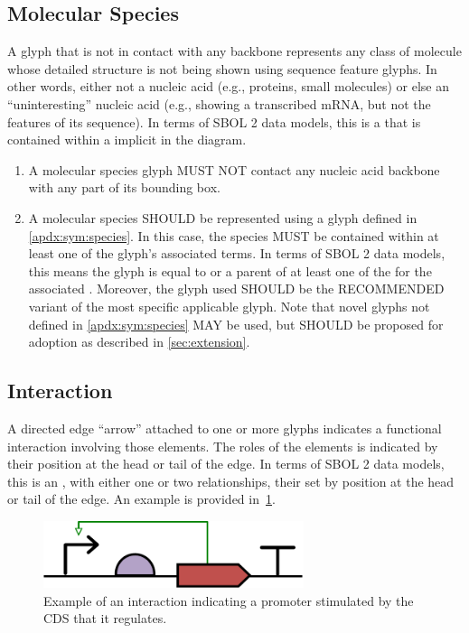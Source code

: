 \subsection{Molecular Species}
A glyph that is not in contact with any backbone represents any class of molecule whose detailed structure is not being shown using sequence feature glyphs.
In other words, either not a nucleic acid (e.g., proteins, small molecules) or else an ``uninteresting'' nucleic acid (e.g., showing a transcribed mRNA, but not the features of its sequence).
In terms of SBOL 2 data models, this is a  that is contained within a  implicit in the diagram.

\begin{enumerate}
\item A molecular species glyph MUST NOT contact any nucleic acid backbone with any part of its bounding box.
\item A molecular species SHOULD be represented using a glyph defined in \ref{apdx:sym:species}.  In this case, the species MUST be contained within at least one of the glyph's associated terms.
In terms of SBOL 2 data models, this means the glyph is equal to or a parent of at least one of the  for the associated .
	Moreover, the glyph used SHOULD be the RECOMMENDED variant of the most specific applicable glyph.  Note that novel glyphs not defined in \ref{apdx:sym:species} MAY be used, but SHOULD be proposed for adoption as described in \ref{sec:extension}.
\end{enumerate}


\subsection{Interaction}

A directed edge ``arrow'' attached to one or more glyphs indicates a functional interaction involving those elements.
The roles of the elements is indicated by their position at the head or tail of the edge.
In terms of SBOL 2 data models, this is an , with either one or two  relationships, their  set by position at the head or tail of the edge.
	An example is provided in~\ref{exa:4}.

	\begin{figure}[h!]
	\centering
	\includegraphics[width=3in]{figures/examples/4-regulation.pdf}
	\caption{Example of an interaction indicating a promoter stimulated by the CDS that it regulates.}
	\label{exa:4}
	\end{figure}
		
